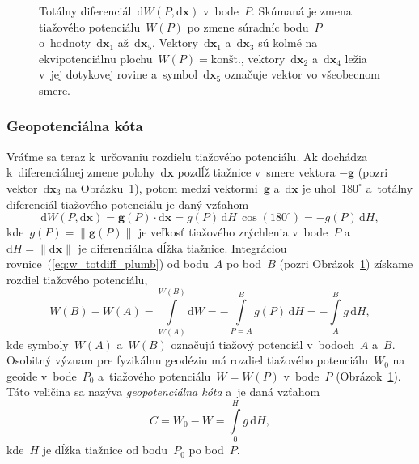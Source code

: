\documentclass[a4paper, 12pt]{book}
\newcommand{\diff}{\mathrm d}
\let\vec\mathbf
\begin{document}
\begin{figure}
\centering

\caption{Totálny diferenciál~$\diff W(P, \diff \vec x)$ v~bode~$P$.  Skúmaná je 
zmena tiažového potenciálu~$W(P)$ po zmene súradníc bodu~$P$ o~hodnoty~$\diff 
\vec x_1$ až~$\diff \vec x_5$.  Vektory~$\diff \vec x_1$ a~$\diff \vec x_3$ sú 
kolmé na ekvipotenciálnu plochu~$W(P) = \textrm{kon\v{s}t.}$, vektory~$\diff 
\vec x_2$ a~$\diff \vec x_4$ ležia v~jej dotykovej rovine a~symbol~$\diff \vec 
x_5$ označuje vektor vo všeobecnom smere.}
\label{fig:total_differential}
\end{figure}

\subsubsection{Geopotenciálna kóta}
\label{sec:geopotential_number}

Vráťme sa teraz k~určovaniu rozdielu tiažového potenciálu.  Ak dochádza 
k~diferenciálnej zmene polohy~$\diff \vec x$ pozdĺž tiažnice v~smere vektora 
$-\vec g$ (pozri vektor~$\diff \vec x_3$ na 
Obrázku~\ref{fig:total_differential}), potom medzi vektormi~$\vec g$ a~$\diff 
\vec x$ je uhol~$180^{\circ}$ a~totálny diferenciál tiažového potenciálu je 
daný vzťahom
%
\begin{equation}
\label{eq:w_totdiff_plumb}
\diff W(P, \diff \vec x) = \vec g(P) \cdot \diff \vec x = g(P) \, \diff H \, 
\cos(180^{\circ}) = -g(P) \, \diff H{,}
\end{equation}
%
kde~$g(P) = \| \vec g(P) \|$ je veľkosť tiažového zrýchlenia v~bode~$P$ 
a~$\diff H = \| \diff \vec x \|$ je diferenciálna dĺžka tiažnice.  Integráciou 
rovnice~(\ref{eq:w_totdiff_plumb}) od bodu~$A$ po bod~$B$ (pozri 
Obrázok~\ref{fig:total_differential}) získame rozdiel tiažového potenciálu,
%
\begin{equation}
\label{eq:w_ab}
W(B) - W(A) = \int\limits_{W(A)}^{W(B)} \diff W = -\int\limits_{P = A}^{B} g(P) 
\, \diff H = -\int\limits_{A}^{B} g \, \diff H{,}
\end{equation}
%
kde symboly~$W(A)$ a~$W(B)$ označujú tiažový potenciál v~bodoch~$A$ a~$B$.  
Osobitný význam pre fyzikálnu geodéziu má rozdiel tiažového potenciálu~$W_0$ na 
geoide v~bode~$P_0$ a~tiažového potenciálu~$W = W(P)$ v~bode~$P$ 
(Obrázok~\ref{fig:total_differential}).  Táto veličina sa nazýva 
\emph{geopotenciálna kóta} a~je daná vzťahom
%
\begin{equation}
\label{eq:geopotential_number}
C = W_0 - W = \int\limits_0^H g \, \diff H{,}
\end{equation}
%
kde~$H$ je dĺžka tiažnice od bodu~$P_0$ po bod~$P$.
\end{document}
